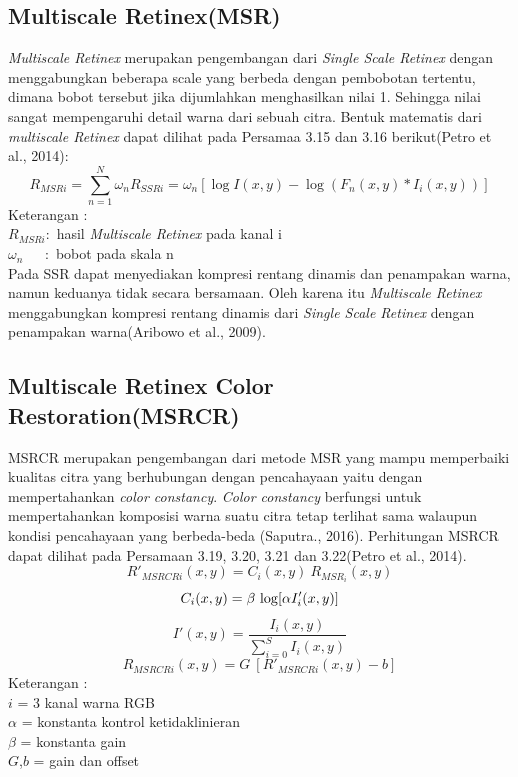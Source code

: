 \subsection{Multiscale Retinex(MSR)}
\emph{Multiscale Retinex} merupakan pengembangan dari \emph{Single Scale Retinex} dengan menggabungkan beberapa scale  yang berbeda dengan pembobotan tertentu, dimana bobot tersebut jika dijumlahkan menghasilkan nilai 1. Sehingga nilai  sangat mempengaruhi detail warna dari sebuah citra. Bentuk matematis dari \emph{multiscale Retinex} dapat dilihat pada Persamaa 3.15 dan 3.16 berikut(Petro et al., 2014):
\begin{equation}
R_{MSRi} = \sum_{n=1}^{N} \omega_n R_{SSRi}=\omega_n [\log I(x,y) - \log (F_n(x,y) * I_i(x,y))]
\end{equation}
Keterangan :
\\
\(R_{MSRi} : \) hasil \emph{Multiscale Retinex} pada kanal i
\\
\(\omega_n \ \ \ \ \ \ \ : \) bobot pada skala n\\
Pada SSR dapat menyediakan kompresi rentang dinamis dan penampakan warna, namun keduanya tidak secara bersamaan. Oleh karena itu \emph{Multiscale Retinex} menggabungkan kompresi rentang dinamis dari \emph{Single Scale Retinex} dengan penampakan warna(Aribowo et al., 2009).
\subsection{Multiscale Retinex Color Restoration(MSRCR)}
MSRCR merupakan pengembangan dari metode MSR yang mampu memperbaiki kualitas citra yang berhubungan dengan pencahayaan yaitu dengan mempertahankan \emph{color constancy}. \emph{Color constancy} berfungsi untuk mempertahankan komposisi warna suatu citra tetap terlihat sama walaupun kondisi pencahayaan yang berbeda-beda (Saputra., 2016). Perhitungan MSRCR dapat dilihat pada Persamaan 3.19, 3.20, 3.21 dan 3.22(Petro et al., 2014).
\begin{equation}
	R'_{MSRCRi}(x,y) = C_i(x,y) \ R_{MSR_i}(x,y)	
\end{equation}
\begin{equation}
	C_i(x,y) = \beta \ {\log[\alpha I'_i(x,y)]}\\
\end{equation}
\begin{equation}
I'(x,y) =\frac{I_i(x,y)}{\sum_{i=0}^{S}I_i(x,y)}
\end{equation}
\begin{equation}
	R_{MSRCRi}(x,y) = G \ [R'_{MSRCRi}(x,y)-b]
\end{equation}
\noindent Keterangan :\\
$i$ = 3 kanal warna RGB\\
$\alpha$ = konstanta kontrol ketidaklinieran\\
$\beta$ = konstanta gain\\
$G$,$b$ = gain dan offset
